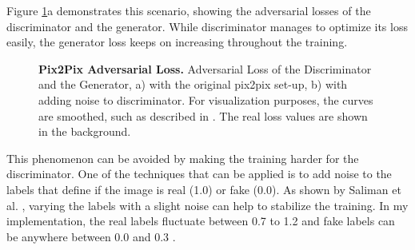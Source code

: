 \documentclass{article}
\begin{document}
Figure \ref{fig:pix2pix_losses}a demonstrates this scenario, showing the adversarial losses of the discriminator and the generator. While discriminator manages to optimize its loss easily, the generator loss keeps on increasing throughout the training. 

\begin{figure}[h]
\centering
{}
\caption{\label{fig:pix2pix_losses} \textbf{Pix2Pix Adversarial Loss.} Adversarial Loss of the Discriminator and the Generator, a) with the original pix2pix set-up, b) with adding noise to discriminator. For visualization purposes, the curves are smoothed, such as described in \cite{noauthor_tensorflows_2018}. The real loss values are shown in the background.}
\end{figure}

This phenomenon can be avoided by making the training harder for the discriminator. One of the techniques that can be applied is to add noise to the labels that define if the image is real (1.0) or fake (0.0). As shown by Saliman et al. \cite{salimans_improved_2016}, varying the labels with a slight noise can help to stabilize the training. In my implementation, the real labels fluctuate between 0.7 to 1.2 and fake labels can be anywhere between 0.0 and 0.3 \cite{preserve_knowledge_how_nodate}.

\end{document}
